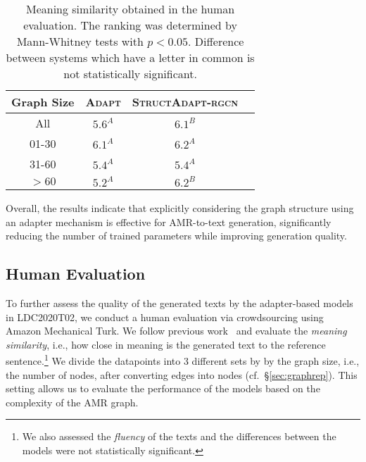 \documentclass[11pt]{article}
\newcommand{\graphadapterrgcn}{{\small\textsc{StructAdapt-rgcn}}\xspace}
\newcommand{\vanilladapter}{{\small\textsc{Adapt}}\xspace}
\begin{document}
\begin{table}[t]
\small
\centering
{\renewcommand{\arraystretch}{0.9}
\setlength\tabcolsep{2pt}
\setlength{\belowrulesep}{1pt}
\setlength{\aboverulesep}{1pt}
\begin{tabular}{c c c c} 
\toprule
\textbf{Graph Size} & \multicolumn{1}{c}{\vanilladapter} & \multicolumn{1}{c}{\graphadapterrgcn} &  \\
\midrule
 {\small All} & ${5.6}^{{\scriptscriptstyle A}}$  & ${6.1}^{{\scriptscriptstyle B}}$ &\\
\midrule
01-30 & ${6.1}^{{\scriptscriptstyle A}}$ & ${6.2}^{{\scriptscriptstyle A}}$ &\\
31-60 & ${5.4}^{{\scriptscriptstyle A}}$ & ${5.4}^{{\scriptscriptstyle A}}$ &\\
${>}60$ & ${5.2}^{{\scriptscriptstyle A}}$ & ${6.2}^{{\scriptscriptstyle B}}$ &\\
\bottomrule
\end{tabular}}


\caption{Meaning similarity obtained in the human evaluation. The ranking was determined by Mann-Whitney tests with $p{<}0.05$. Difference between systems which have a letter in common is not statistically significant.}
\label{tab:humanevevaluation}
\end{table}

Overall, the results indicate that explicitly considering the graph structure using an adapter mechanism is effective for AMR-to-text generation, significantly reducing the number of trained parameters while improving generation quality. 



\subsection{Human Evaluation}
\label{sec:humanEval}
To further assess the quality of the generated texts by the adapter-based models in LDC2020T02, we conduct a human evaluation via crowdsourcing using Amazon Mechanical Turk.  We follow previous work~\cite{ribeiro-etal-2019-enhancing,castro-ferreira-etal-2019-neural} and evaluate the \emph{meaning similarity}, i.e., how close in meaning is the generated text to the reference sentence.\footnote{We also assessed the \emph{fluency} of the texts and the differences between the models were not statistically significant.} We divide the datapoints into 3 different sets by by the graph size, i.e., the number of nodes, after converting edges into nodes (cf.\ \S\ref{sec:graphrep}). This setting allows us to evaluate the performance of the models based on the complexity of the AMR graph.
\end{document}
